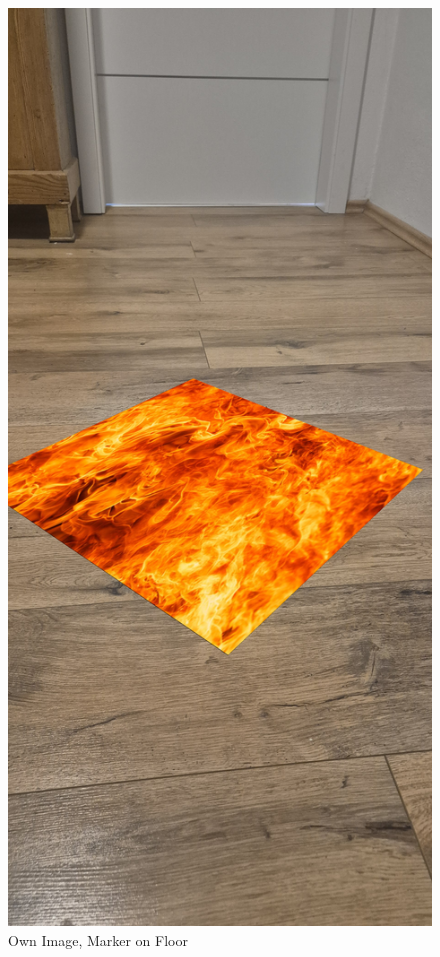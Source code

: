 \documentclass[a4paper,twocolumn]{article}
\begin{document}
\begin{figure}[htbp]
    \centering
    \includegraphics[width=\columnwidth, keepaspectratio]{newOutput/20241129_153124.jpg}
    \caption{Own Image, Marker on Floor \cite{tim-schweitzer}}
    \label{fig:example-appendix1}
\end{figure}
\end{document}
